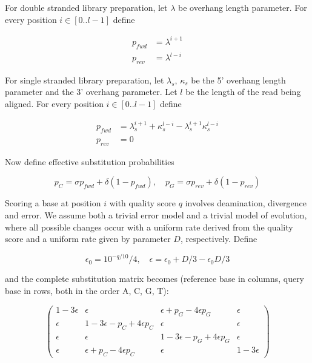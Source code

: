 \documentclass[11pt,a4paper]{report}
\begin{document}
For double stranded library preparation, let $\lambda$ be overhang
length parameter.  For every position $i \in [0..l-1]$ define

\begin{align*}
p_{fwd} &= \lambda^{i+1} \\
p_{rev} &= \lambda^{l-i} 
\end{align*}

For single stranded library preparation, let $\lambda_s$, $\kappa_s$ be
the 5' overhang length parameter and the 3' overhang parameter.  Let $l$
be the length of the read being aligned.  For every position $i \in
[0..l-1]$ define

\begin{align*}
p_{fwd} &= \lambda_s^{i+1} + \kappa_s^{l-i} - \lambda_s^{i+1} \kappa_s^{l-i} \\
p_{rev} &= 0
\end{align*}

Now define effective substitution probabilities

\begin{equation*}
p_{C} = \sigma p_{fwd} + \delta (1 - p_{fwd}), \quad
p_{G} = \sigma p_{rev} + \delta (1 - p_{rev}) 
\end{equation*}

Scoring a base at position $i$ with quality score $q$ involves
deamination, divergence and error.  We assume both a trivial error model
and a trivial model of evolution, where all possible changes occur with
a uniform rate derived from the quality score and a uniform rate given
by parameter $D$, respectively.  Define 

\begin{equation*}
\epsilon_0 = {10^{-q/10}}/4, \quad \epsilon = \epsilon_0 + D/3 - \epsilon_0 D/3
\end{equation*}

and the complete substitution matrix becomes (reference base in columns,
query base in rows, both in the order A, C, G, T):

\begin{equation*}
\left( \begin{array}{cccc}
1 - 3 \epsilon &       \epsilon                            &       \epsilon + p_{G} - 4 \epsilon p_{G} &       \epsilon \\
      \epsilon & 1 - 3 \epsilon - p_{C} + 4 \epsilon p_{C} &       \epsilon                            &       \epsilon \\
      \epsilon &       \epsilon                            & 1 - 3 \epsilon - p_{G} + 4 \epsilon p_{G} &       \epsilon \\
      \epsilon &       \epsilon + p_{C} - 4 \epsilon p_{C} &       \epsilon                            & 1 - 3 \epsilon 
\end{array} \right)
\end{equation*}
\end{document}
